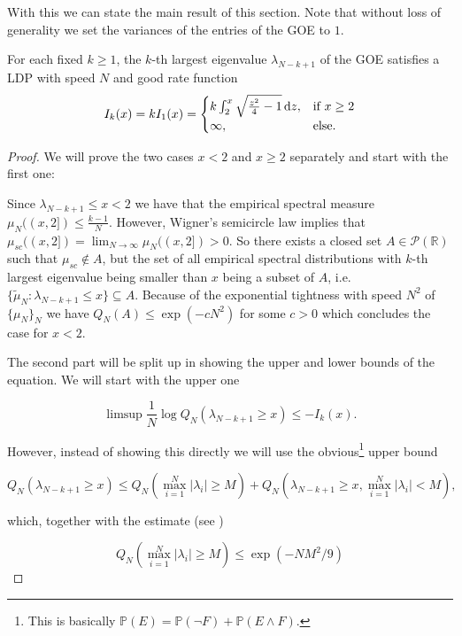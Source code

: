 With this we can state the main result of this section. Note that without loss of generality we set the variances of the entries of the GOE to $1$.
\begin{theorem}\label{thm:A1}
	For each fixed $k\geq 1$, the $k$-th largest eigenvalue $\lambda_{N-k+1}$ of the GOE satisfies a LDP with speed $N$ and good rate function
	$$I_k(x)=kI_1(x)=\begin{cases}
						k\int_2^x\sqrt{\frac{z^2}{4}-1}\mathop{}\!\mathrm{d} z, &\mbox{if } x\geq 2 \\
						\infty, &\mbox{else.}
					  \end{cases}$$
\end{theorem}
\begin{proof}
	We will prove the two cases $x<2$ and $x\geq 2$ separately and start with the first one:
	
	Since $\lambda_{N-k+1}\leq x<2$ we have that the empirical spectral measure $\mu_N((x,2])\leq \frac{k-1}{N}$. However, Wigner's semicircle law implies that $\mu_{sc}((x,2])=\lim_{N\rightarrow\infty} \mu_N((x,2])>0$. So there exists a closed set $A\in\mathcal P(\mathbb R)$ such that $\mu_{sc}\notin A$, but the set of all empirical spectral distributions with $k$-th largest eigenvalue being smaller than $x$ being a subset of $A$, i.e. $\{\tilde \mu_N:\lambda_{N-k+1}\leq x\}\subseteq A$. Because of the exponential tightness with speed $N^2$ of $\{\mu_N\}_N$ we have $Q_N(A)\leq\exp(-cN^2)$ for some $c>0$ which concludes the case for $x<2$.
	
	The second part will be split up in showing the upper and lower bounds of the equation. We will start with the upper one
	
	\begin{equation}\label{eq:LDPlargestEVupperbound}
		\limsup \frac{1}{N}\log Q_N(\lambda_{N-k+1}\geq x)\leq -I_k(x).
	\end{equation}
	
	However, instead of showing this directly we will use the obvious\footnote{This is basically $\mathbb P(E)=\mathbb P(\neg F)+\mathbb P(E\land F)$.} upper bound
	
	$$Q_N(\lambda_{N-k+1}\geq x)\leq Q_N(\max_{i=1}^N |\lambda_i|\geq M)+ Q_N(\lambda_{N-k+1}\geq x,\max_{i=1}^N|\lambda_i|<M),$$
	
	which, together with the estimate (see \cite{ArousAging})
	
	\begin{equation}\label{eq:maxEVinequality}
		Q_N(\max_{i=1}^N|\lambda_i|\geq M)\leq \exp(-NM^2/9)
	\end{equation}
	

\end{proof}
